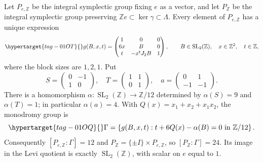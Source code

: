 \begin{theorem}\hypertarget{tag-01R9}{}\label{fam:src:F.1.1}\label{fam:st:F.1.1}\label{cdp:st:D.1.14}

Let $P_{e,\mathbb Z}$ be the integral symplectic group fixing $e$ as a
vector, and let $P_{\mathbb Z}$ be the integral symplectic group preserving
$\mathbb Ze\subset\ker\gamma\subset\Lambda$.  Every element of
$P_{e,\mathbb Z}$ has a unique expression
\begin{equation}\hypertarget{tag-01OT}{}\label{fam:eq:F-g}
 g(B,x,t)=
 \begin{pmatrix}
 1&0&0\\6x&B&0\\t&-x^{\mathsf t}J_2B&1
 \end{pmatrix},\qquad
 B\in\operatorname{SL}_2(\mathbb Z),\quad x\in\mathbb Z^2,\quad t\in\mathbb Z,
\end{equation}
where the block sizes are $1,2,1$.  Put
\[
 S=\begin{pmatrix}0&-1\\1&0\end{pmatrix},\quad
 T=\begin{pmatrix}1&1\\0&1\end{pmatrix},\quad
 a=\begin{pmatrix}0&1\\-1&-1\end{pmatrix}.
\]
There is a homomorphism
$\alpha:\operatorname{SL}_2(\mathbb Z)\to\mathbb Z/12$ determined by
$\alpha(S)=9$ and $\alpha(T)=1$; in particular $\alpha(a)=4$.
With $Q(x)=x_1+x_2+x_1x_2$, the monodromy group is
\begin{equation}\hypertarget{tag-01OQ}{}\label{fam:eq:F-Gamma}
 \Gamma=\left\{g(B,x,t):t+6Q(x)-\alpha(B)=0\ \text{in }\mathbb Z/12\right\}.
\end{equation}
Consequently $[P_{e,\mathbb Z}:\Gamma]=12$ and
$P_{\mathbb Z}=\{\pm I\}\times P_{e,\mathbb Z}$, so
$[P_{\mathbb Z}:\Gamma]=24$.  Its image in the Levi quotient is exactly
$\operatorname{SL}_2(\mathbb Z)$, with scalar on $e$ equal to $1$.
\end{theorem}



